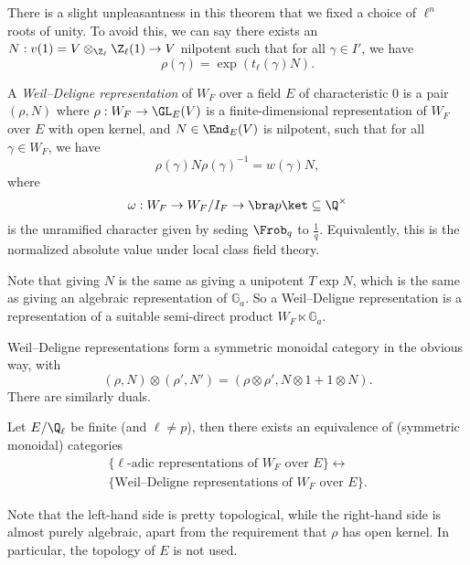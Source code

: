 \documentclass[a4paper]{article}
\renewcommand\G{\mathbb{G}}
\begin{document}
There is a slight unpleasantness in this theorem that we fixed a choice of $\ell^n$ roots of unity. To avoid this, we can say there exists an $N: v(1) = V \otimes_{\Z_\ell} \Z_{\ell}(1) \to V$ nilpotent such that for all $\gamma \in I'$, we have
\[
  \rho(\gamma) = \exp (t_\ell(\gamma) N).
\]
\begin{defi}
  A \emph{Weil--Deligne representation} of $W_F$ over a field $E$ of characteristic $0$ is a pair $(\rho, N)$ where $\rho: W_F \to \GL_E(V)$ is a finite-dimensional representation of $W_F$ over $E$ with open kernel, and $N \in \End_E(V)$ is nilpotent, such that for all $\gamma \in W_F$, we have
  \[
    \rho(\gamma) N \rho(\gamma)^{-1} = w(\gamma) N,
  \]
  where
  \[
    \omega: W_F \to W_F/I_F \to \bra p\ket \subseteq \Q^\times
  \]
  is the unramified character given by seding $\Frob_q$ to $\frac{1}{q}$. Equivalently, this is the normalized absolute value under local class field theory.
\end{defi}
Note that giving $N$ is the same as giving a unipotent $T \exp N$, which is the same as giving an algebraic representation of $\G_a$. So a Weil--Deligne representation is a representation of a suitable semi-direct product $W_F \ltimes \G_a$.

Weil--Deligne representations form a symmetric monoidal category in the obvious way, with
\[
  (\rho, N ) \otimes (\rho', N') = (\rho \otimes \rho', N \otimes 1 + 1 \otimes N).
\]
There are similarly duals.

\begin{thm}
  Let $E/\Q_\ell$ be finite (and $\ell \not= p$), then there exists an equivalence of (symmetric monoidal) categories
  \begin{multline*}
    \{\ell\text{-adic representations of $W_F$ over $E$}\} \leftrightarrow\\
    \{\text{Weil--Deligne representations of $W_F$ over $E$}\}.
  \end{multline*}
\end{thm}
Note that the left-hand side is pretty topological, while the right-hand side is almost purely algebraic, apart from the requirement that $\rho$ has open kernel. In particular, the topology of $E$ is not used.
\end{document}
